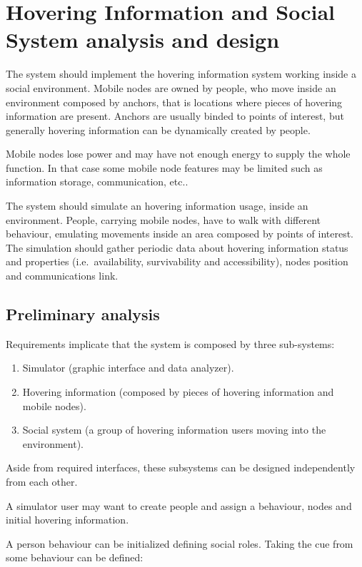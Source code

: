 \section{Hovering Information and Social System analysis and design}
\label{sec:design}

The system should implement the hovering information system working inside
a social environment. Mobile nodes are owned by people, who move inside an
environment composed by anchors, that is locations where pieces of hovering
information are present. Anchors are usually binded to points of interest, but
generally hovering information can be dynamically created by people.

Mobile nodes lose power and may have not enough energy to supply the whole
function.  In that case some mobile node features may be limited such as
information storage, communication, etc..

The system should simulate an hovering information usage, inside an
environment.  People, carrying mobile nodes, have to walk with different
behaviour, emulating movements inside an area composed by points of interest.
The simulation should gather periodic data about hovering information status
and properties (i.e.\ availability, survivability and accessibility), nodes
position and communications link.

\subsection{Preliminary analysis}

Requirements implicate that the system is composed by three sub-systems:
\begin{enumerate}
	\item Simulator (graphic interface and data analyzer).
	\item Hovering information (composed by pieces of hovering information and
		mobile nodes).
	\item Social system (a group of hovering information users moving into
		the environment).
\end{enumerate}

Aside from required interfaces, these subsystems can be designed independently
from each other.

A simulator user may want to create people and assign a behaviour, nodes and
initial hovering information.

A person behaviour can be initialized defining social roles. Taking the cue from
\cite{human} some behaviour can be defined:

